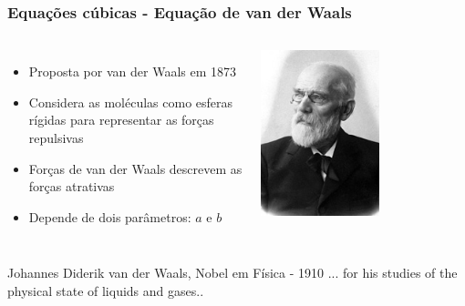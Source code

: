 \documentclass[aspectratio=169]{beamer}
\begin{document}
\begin{frame}
	\frametitle{Equações cúbicas - Equação de van der Waals}
	\begin{columns}[c] 
		\begin{itemize}
		\item Proposta por van der Waals em 1873
		\item Considera as moléculas como esferas \\
		rígidas para representar as forças\\
		repulsivas
		\item Forças de van der Waals descrevem as\\
		forças atrativas
		\item Depende de dois parâmetros: $a$ e $b$
		\end{itemize}
	\begin{center}
		\includegraphics[width=0.8\textwidth]{img/waals.jpg}
	\end{center}
	\end{columns}
	\begin{columns}
			\begin{exampleblock}{Johannes Diderik van der Waals, Nobel em Física - 1910}
				... for his studies of the physical state of liquids and gases..
			\end{exampleblock}
	\end{columns}
\end{frame}
\end{document}

